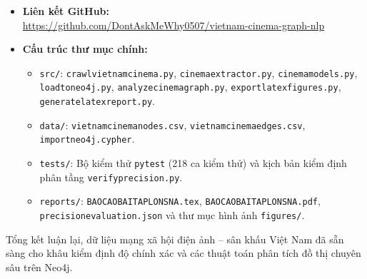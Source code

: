 \documentclass[12pt,a4paper]{article}
\renewcommand{\_}{\oldunderscore\hspace{0pt}}
\begin{document}
\begin{itemize}
  \item \textbf{Liên kết GitHub:}\\[0.2em]
  \url{https://github.com/DontAskMeWhy0507/vietnam-cinema-graph-nlp}
  \item \textbf{Cấu trúc thư mục chính:}
  \begin{itemize}\raggedright
    \item \texttt{src/}: \texttt{crawl\_vietnam\_cinema.py}, \texttt{cinema\_extractor.py}, \texttt{cinema\_models.py}, \texttt{load\_to\_neo4j.py}, \texttt{analyze\_cinema\_graph.py}, \texttt{export\_latex\_figures.py}, \texttt{generate\_latex\_report.py}.
    \item \texttt{data/}: \texttt{vietnam\_cinema\_nodes.csv}, \texttt{vietnam\_cinema\_edges.csv}, \texttt{import\_neo4j.cypher}.
    \item \texttt{tests/}: Bộ kiểm thử \texttt{pytest} (218 ca kiểm thử) và kịch bản kiểm định phân tầng \texttt{verify\_precision.py}.
    \item \texttt{reports/}: \texttt{BAO\_CAO\_BAI\_TAP\_LON\_SNA.tex}, \texttt{BAO\_CAO\_BAI\_TAP\_LON\_SNA.pdf}, \texttt{precision\_evaluation.json} và thư mục hình ảnh \texttt{figures/}.
  \end{itemize}
\end{itemize}

Tổng kết luận lại, dữ liệu mạng xã hội điện ảnh -- sân khấu Việt Nam đã sẵn sàng cho khâu kiểm định độ chính xác và các thuật toán phân tích đồ thị chuyên sâu trên Neo4j.
\end{document}
